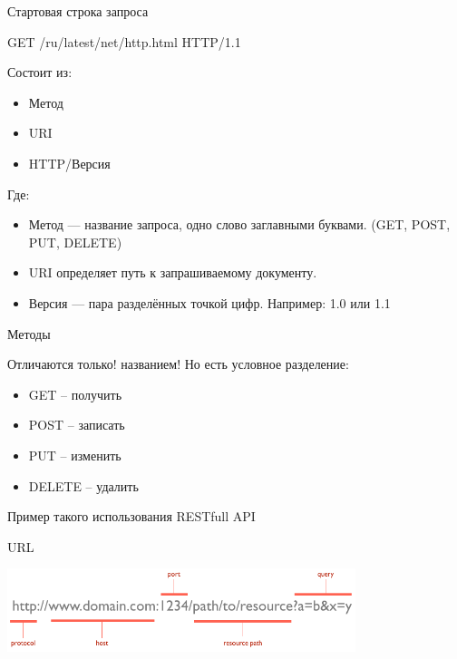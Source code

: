 \documentclass[c,unicode,russian]{beamer}
\begin{document}
\begin{frame}{Стартовая строка запроса}

    GET /ru/latest/net/http.html HTTP/1.1

    Состоит из:
    \begin{itemize}
        \item Метод
        \item URI
        \item HTTP/Версия
    \end{itemize}

    Где:

    \begin{itemize}
        \item Метод — название запроса, одно слово заглавными
            буквами. (GET, POST, PUT, DELETE)
        \item URI определяет путь к запрашиваемому документу.
        \item Версия — пара разделённых точкой цифр. \newline
            Например: 1.0 или 1.1
    \end{itemize}

\end{frame}

\begin{frame}{Методы}

    Отличаются только! названием! \newline
    Но есть условное разделение:

    \begin{itemize}
        \item GET \--- получить
        \item POST \--- записать
        \item PUT \--- изменить
        \item DELETE \--- удалить
    \end{itemize}

    Пример такого использования RESTfull API

\end{frame}

\begin{frame}{URL}
 \begin{center}
     \includegraphics[width=4in]{media/url-structure.png}
 \end{center}
\end{frame}
\end{document}
